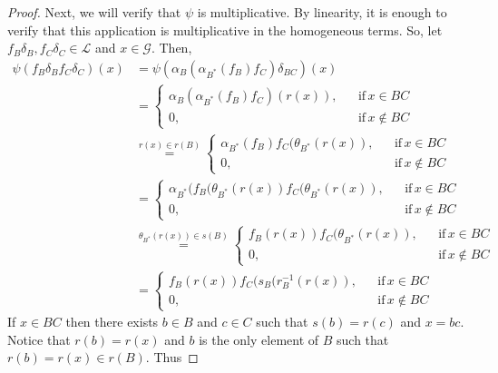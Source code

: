 \documentclass[11pt, a4paper]{amsart}
\newcommand{\G}{\ensuremath {\mathcal{G}}}
\theoremstyle{plain}
\begin{document}
\begin{proof}
Next, we will verify that $\psi$ is multiplicative. By linearity, it is enough to verify that this application is multiplicative in the homogeneous terms. So, let $f_B\delta_B, f_C\delta_C \in \mathcal{L} $ and $x \in \G.$ Then,
\begin{align*}
\psi(f_B\delta_B f_C \delta_C)(x) 
       & = \psi(\alpha_B(\alpha_{B^*}(f_B)f_C)\delta_{BC})(x) \\
       & = \left\lbrace \begin{array}{lcl}
           \alpha_B(\alpha_{B^*}(f_B)f_C)(r(x)), & & \mbox{if} \, x \in BC \\
                                              0, & & \mbox{if} \, x \notin BC
           \end{array}\right.\\
       & \stackrel{r(x) \in r(B)}{=} \left\lbrace \begin{array}{lcl}
           \alpha_{B^*}(f_B)f_C(\theta_{B^*}(r(x)), & & \mbox{if} \, x \in BC \\
                                                 0, & & \mbox{if} \, x \notin BC
           \end{array}\right.\\
       & = \left\lbrace \begin{array}{lcl}
           \alpha_{B^*}(f_B(\theta_{B^*}(r(x))f_C(\theta_{B^*}(r(x)), & & \mbox{if} \, x \in BC \\
                                                                   0, & & \mbox{if} \, x \notin BC
           \end{array}\right.\\
       & \stackrel{\theta_{B^*}(r(x)) \in s(B)}{=} \left\lbrace \begin{array}{lcl}
           f_B(r(x))f_C(\theta_{B^*}(r(x)), & & \mbox{if} \, x \in BC \\
                                         0, & & \mbox{if} \, x \notin BC
           \end{array}\right.\\
       & = \left\lbrace \begin{array}{lcl}
           f_B(r(x))f_C(s_B(r_B^{-1}(r(x)), & & \mbox{if} \, x \in BC \\
                                         0, & & \mbox{if} \, x \notin BC
           \end{array}\right.
\end{align*}
If $x \in BC$ then there exists $b \in B$ and $c \in C$ such that $s(b)=r(c)$ and $x=bc.$ Notice that $r(b)=r(x)$ and $b$ is the only element of $B$ such that $r(b)=r(x) \in r(B).$ Thus

\end{proof}
\end{document}
